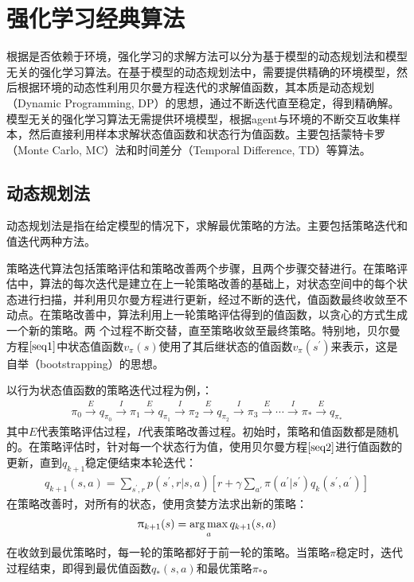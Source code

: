\section{强化学习经典算法}
根据是否依赖于环境，强化学习的求解方法可以分为基于模型的动态规划法和模型无关的强化学习算法。在基于模型的动态规划法中，需要提供精确的环境模型，然后根据环境的动态性利用贝尔曼方程迭代的求解值函数，其本质是动态规划（Dynamic Programming, DP）的思想，通过不断迭代直至稳定，得到精确解。模型无关的强化学习算法无需提供环境模型，根据agent与环境的不断交互收集样本，然后直接利用样本求解状态值函数和状态行为值函数。主要包括蒙特卡罗（Monte Carlo, MC）法和时间差分（Temporal Difference, TD）等算法。

\subsection{动态规划法}
动态规划法是指在给定模型的情况下，求解最优策略的方法。主要包括策略迭代和值迭代两种方法。

策略迭代算法包括策略评估和策略改善两个步骤，且两个步骤交替进行。在策略评估中，算法的每次迭代是建立在上一轮策略改善的基础上，对状态空间中的每个状态进行扫描，并利用贝尔曼方程进行更新，经过不断的迭代，值函数最终收敛至不动点。在策略改善中，算法利用上一轮策略评估得到的值函数，以贪心的方式生成一个新的策略。两
个过程不断交替，直至策略收敛至最终策略。特别地，贝尔曼方程$\eqref{seq1}$中状态值函数$v_{\pi}(s)$使用了其后继状态的值函数$v_{\pi}(s^{'})$来表示，这是自举（bootstrapping）的思想。

以行为状态值函数的策略迭代过程为例，：
\begin{displaymath}
\begin{aligned}
\pi_{0}\xrightarrow{E}q_{\pi_0}\xrightarrow{I}\pi_{1}\xrightarrow{E}q_{\pi_1}\xrightarrow{I}\pi_{2}\xrightarrow{E}q_{\pi_2}\xrightarrow{I}\pi_{3}\xrightarrow{E} \cdots \xrightarrow{I}\pi_{*}\xrightarrow{E}q_{\pi_{*}}
\end{aligned}
\end{displaymath}
其中$E$代表策略评估过程，$I$代表策略改善过程。初始时，策略和值函数都是随机的。在策略评估时，针对每一个状态行为值，使用贝尔曼方程$\eqref{seq2}$进行值函数的更新，直到$q_{k+1}$稳定便结束本轮迭代：
\begin{equation}
\begin{aligned}
q_{k+1}(s,a)=\sum_{s^{'},r}p(s^{'},r|s,a)[r+\gamma \sum_{a'}\pi(a^{'}|s^{'}) q_{k}(s^{'},a^{'})]
\end{aligned}
\end{equation}
在策略改善时，对所有的状态，使用贪婪方法求出新的策略：
\begin{equation}
\begin{aligned}
\uppi_{k+1}(s)=\operatorname*{arg\,max}_{a}q_{k+1}(s,a)
\end{aligned}
\end{equation}
在收敛到最优策略时，每一轮的策略都好于前一轮的策略。当策略$\pi$稳定时，迭代过程结束，即得到最优值函数$q_{*}(s,a)$和最优策略$\pi_{*}$。

